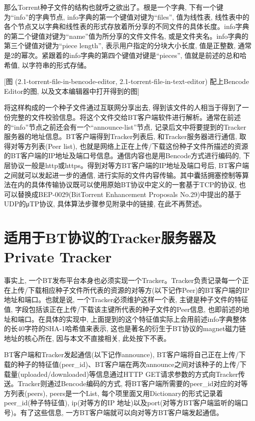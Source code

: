 那么Torrent种子文件的结构也就呼之欲出了。根是一个字典, 下有一个键为``info''的字典节点, info字典的第一个键值对键为``files'', 值为线性表, 线性表中的各个节点又以字典和线性表的形式存放着所分享的不同文件的具体长度。info字典的第二个键值对键为``name''值为所分享的文件文件名, 或是文件夹名。info字典的第三个键值对键为``piece length'', 表示用户指定的分块大小长度, 值是正整数, 通常是2的幂次。紧跟着的info字典的第四个键值对键是``pieces'', 值就是前述的总和哈希值, 以字符串的形式存储。

[图 (2.1-torrent-file-in-bencode-editor, 2.1-torrent-file-in-text-editor) 配上Bencode Editor的图, 以及文本编辑器中打开得到的图]

将这样构成的一个种子文件通过互联网分享出去, 得到该文件的人相当于得到了一份完整的文件校验信息。将这个文件交给BT客户端软件进行解析。通常在前述的``info''节点之前还会有一个``announce-list''节点, 记录后文中将要提到的Tracker服务器的地址信息。BT客户端得到Tracker列表后, 和Tracker服务器进行通信, 取得对等方列表(Peer list), 也就是网络上正在上传/下载这份种子文件所描述的资源的BT客户端的IP地址及端口号信息。通信内容也是用Bencode方式进行编码的, 下层协议一般是http或https。得到对等方BT客户端的IP地址及端口号后, BT客户端之间就可以发起进一步的通信, 进行实际的文件内容传输。其中囊括拥塞控制等算法在内的具体传输协议既可以使用原始BT协议中定义的一套基于TCP的协议, 也可以替换成BEP-0029\cite{arvidnorberg2009bep0029}(BitTorrent Enhancement Proposals No.29)中提出的基于UDP的μTP协议, 具体算法步骤参见附录中的链接, 在此不再赘述。


\section{适用于BT协议的Tracker服务器及Private Tracker}
\label{sec:TrackerAndPrivateTracker}

事实上, 一个BT发布平台本身也必须实现一个Tracker。Tracker负责记录每一个正在上传/下载相应种子文件所代表的资源的对等方(以下记作Peer)的BT客户端的IP地址和端口。也就是说, 一个Tracker必须维护这样一个表, 主键是种子文件的特征值, 字段包括该正在上传/下载该主键所代表的种子文件的Peer信息, 也即前述的地址和端口。在具体的实现中, 上面提到的这个特征值实际上会用前述info字典整体的长40字符的SHA-1哈希值来表示, 这也是著名的衍生于BT协议的magnet磁力链地址\cite{greghazel2008bep0009}的核心所在, 因与本文不直接相关, 此处按下不表。

BT客户端和Tracker发起通信(以下记作announce), BT客户端将自己正在上传/下载的种子的特征值(peer\_id)、BT客户端在两次announce之间对该种子的上传/下载量(uploaded/downloaded)等信息通过HTTP GET请求参数的方式向Tracker传送。Tracker则通过Bencode编码的方式, 将BT客户端所需要的peer\_id对应的对等方列表(peers), peers是一个List, 每个项里面又用Dictionary的形式记录着peer\_id(种子特征值), ip(对等方的IP 地址)以及port(对等方BT客户端监听的端口号)。有了这些信息, 一方BT客户端就可以向对等方BT客户端发起通信。


